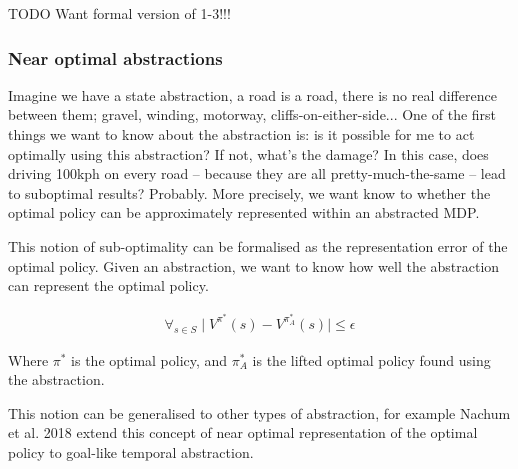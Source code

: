 
{\color{red}TODO Want formal version of 1-3!!!}


\subsubsection{Near optimal abstractions}

Imagine we have a state abstraction, a road is a road, there is no real difference
between them; gravel, winding, motorway, cliffs-on-either-side...
One of the first things we want to know about the abstraction is:
is it possible for me to act optimally
using this abstraction? If not, what's the damage? In this case, does driving 100kph on every road --
because they are all pretty-much-the-same -- lead to suboptimal results? Probably.
More precisely, we want know to whether the optimal policy can be approximately represented within an abstracted MDP.

This notion of sub-optimality can be formalised as the representation error of the optimal
policy. \cite{Abel2017} Given an abstraction, we want to know how well the abstraction can represent the optimal policy.

\begin{align}
\forall_{s\in S} \mid V^{\pi^* }(s) - V^{\pi_{A}^* }(s) \mid \le \epsilon
\end{align}

Where $\pi^{* }$ is the optimal policy, and $\pi_{A}^{* }$ is the lifted optimal
policy found using the abstraction.

This notion can be generalised to other types of abstraction, for example
Nachum et al. 2018 \cite{Nachum2018} extend this concept of near optimal
representation of the optimal policy to goal-like temporal abstraction. \footnotemark[13]


